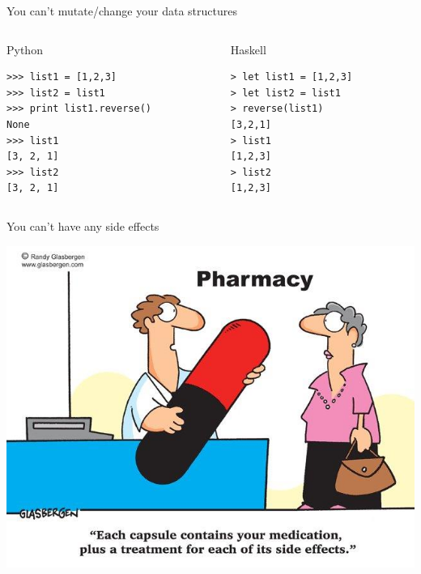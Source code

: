 \documentclass[mathserif]{beamer}
\begin{document}
\begin{frame}[fragile]{You can't mutate/change your data structures}
     \begin{columns}[t]
     \begin{column}[T]{5cm}
Python
\begin{verbatim}
>>> list1 = [1,2,3]
>>> list2 = list1
>>> print list1.reverse()
None
>>> list1
[3, 2, 1]
>>> list2
[3, 2, 1]
\end{verbatim}
     \end{column}

     \begin{column}[T]{5cm}
Haskell
\begin{verbatim}
> let list1 = [1,2,3]
> let list2 = list1
> reverse(list1)
[3,2,1]
> list1
[1,2,3]
> list2
[1,2,3]
\end{verbatim}
     \end{column}


     \end{columns}
\end{frame}

\begin{frame}{You can't have any side effects}
  \begin{center}
    \includegraphics[scale=0.4]{img/side-effects-cartoon.jpg}
  \end{center}
\end{frame}
\end{document}
